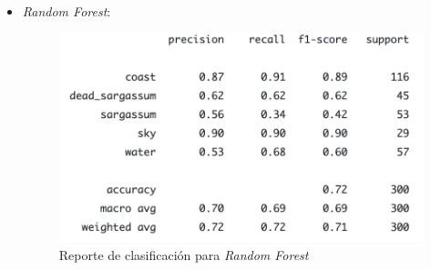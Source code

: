 \documentclass[conference]{IEEEtran}
\begin{document}
\begin{itemize}
    \item \textit{Random Forest}:
		\begin{figure}[H]
		    \centering
		    \includegraphics[scale=0.4]{imgs/rf_clasif_report.png}
		    \caption{Reporte de clasificación para \textit{Random Forest}}
		    \label{fig:rf_cr}
		\end{figure}
		

\end{itemize}
\end{document}
